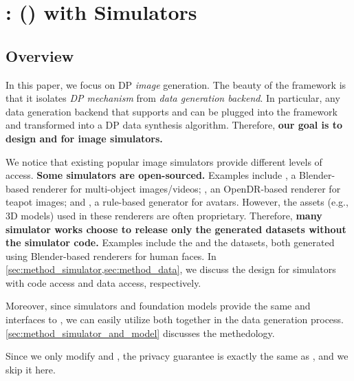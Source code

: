 \section{\simpe{}: \privateevolution{} (\pe{}) with Simulators}

\subsection{Overview}

In this paper, we focus on DP \emph{image} generation.
The beauty of the \privateevolution{} framework is that it isolates \emph{DP mechanism} from \emph{data generation backend}. In particular, any data generation backend that supports \randomsampleapiname{} and \samplevariationapiname{} can be plugged into the framework and transformed into a DP data synthesis algorithm. Therefore, \textbf{our goal is to design \randomsampleapiname{} and \samplevariationapiname{} for image simulators.}


We notice that existing popular image simulators provide different levels of access.
\textbf{Some simulators are open-sourced.} Examples include \kubric{} \cite{greff2021kubric}, a Blender-based renderer for multi-object images/videos; \teapot{} \cite{lin2020infogan,eastwood2018framework}, an OpenDR-based renderer for teapot images; and \pythonavatar{} \cite{pythonavatar}, a rule-based generator for avatars. However, the assets (e.g., 3D models) used in these renderers are often proprietary.
Therefore, \textbf{many simulator works choose to release only the generated datasets without the simulator code.} Examples include the \facesynthetics{} \cite{wood2021fake} and the \digiface{} \cite{bae2023digiface} datasets, both generated using Blender-based renderers for human faces.
In \cref{sec:method_simulator,sec:method_data}, we discuss the design for simulators with code access and data access, respectively.

Moreover, since simulators and foundation models provide the same \randomsampleapiname{} and \samplevariationapiname{} interfaces to \pe{}, we can easily utilize both together in the data generation process. \cref{sec:method_simulator_and_model} discusses the methedology. 

 Since we only modify \randomsampleapiname{} and \samplevariationapiname{}, the privacy guarantee is exactly the same as \citet{lin2023differentially}, and we skip it here.



